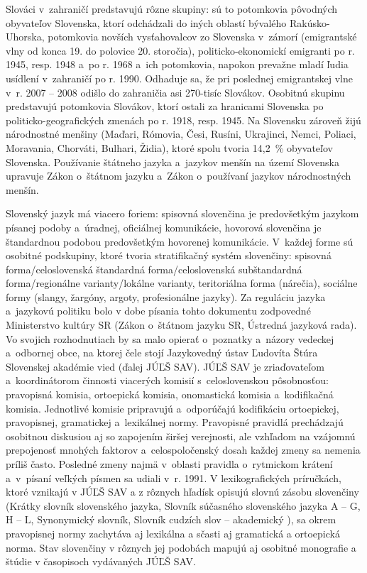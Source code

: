 \begin{multicols}{2}

Slováci v~zahraničí predstavujú rôzne skupiny: sú to potomkovia pôvodných obyvateľov Slovenska, ktorí odchádzali do iných oblastí bývalého Rakúsko-Uhorska, potomkovia novších vysťahovalcov zo Slovenska v~zámorí (emigrantské vlny od konca 19. do polovice 20. storočia), politicko-ekonomickí emigranti po r. 1945, resp. 1948 a~po r. 1968 a~ich potomkovia, napokon prevažne mladí ľudia usídlení v~zahraničí po r. 1990. Odhaduje sa, že pri poslednej emigrantskej vlne v~r. 2007 – 2008 odišlo do zahraničia asi 270-tisíc Slovákov. Osobitnú skupinu predstavujú potomkovia Slovákov, ktorí ostali za hranicami Slovenska po politicko-geografických zmenách po r. 1918, resp. 1945. Na Slovensku zároveň žijú národnostné menšiny (Maďari, Rómovia, Česi, Rusíni, Ukrajinci, Nemci, Poliaci, Moravania, Chorváti, Bulhari, Židia), ktoré spolu tvoria 14,2~\% obyvateľov Slovenska. Používanie štátneho jazyka a~jazykov menšín na území Slovenska upravuje Zákon o~štátnom jazyku a~Zákon o~používaní jazykov národnostných menšín.

Slovenský jazyk má viacero foriem: spisovná slovenčina je predovšetkým jazykom písanej podoby a~úradnej, oficiálnej komunikácie, hovorová slovenčina je štandardnou podobou predovšetkým hovorenej komunikácie. V~každej forme sú osobitné podskupiny, ktoré tvoria stratifikačný systém slovenčiny: spisovná forma/celoslovenská štandardná forma/celoslovenská subštandardná forma/regionálne varianty/lokálne varianty, teritoriálna forma (nárečia), sociálne formy (slangy, žargóny, argoty, profesionálne jazyky). Za reguláciu jazyka a~jazykovú politiku bolo v dobe písania tohto dokumentu zodpovedné Ministerstvo kultúry SR (Zákon o~štátnom jazyku SR, Ústredná jazyková rada). Vo svojich rozhodnutiach by sa malo opierať o~poznatky a~názory vedeckej a~odbornej obce, na ktorej čele stojí Jazykovedný ústav Ľudovíta Štúra Slovenskej akadémie vied (ďalej JÚĽŠ SAV).
JÚĽŠ SAV je zriaďovateľom a~koordinátorom činnosti viacerých komisií s~celoslovenskou pôsobnosťou: pravopisná komisia, ortoepická komisia, onomastická komisia a~kodifikačná komisia. Jednotlivé komisie pripravujú a~odporúčajú kodifikáciu ortoepickej, pravopisnej, gramatickej a~lexikálnej normy. Pravopisné pravidlá prechádzajú osobitnou diskusiou aj so zapojením širšej verejnosti, ale vzhľadom na vzájomnú prepojenosť mnohých faktorov a~celospoločenský dosah každej zmeny sa nemenia príliš často. Posledné zmeny najmä v~oblasti pravidla o~rytmickom krátení a~v~písaní veľkých písmen sa udiali v~r. 1991. V lexikografických príručkách, ktoré vznikajú v JÚĽŠ SAV a z rôznych hľadísk opisujú slovnú zásobu slovenčiny (Krátky slovník slovenského jazyka, Slovník súčasného slovenského jazyka A – G, H – L, Synonymický slovník, Slovník cudzích slov – akademický \cite{kssj2003,sssj2006,sssj2011,sss2004,scs2005}), sa okrem pravopisnej normy zachytáva aj lexikálna a sčasti aj gramatická a ortoepická norma. Stav slovenčiny v rôznych jej podobách mapujú aj osobitné monografie a štúdie v časopisoch vydávaných JÚĽŠ SAV.


\end{multicols}
